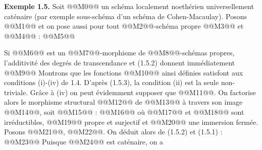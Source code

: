 
\textbf{Exemple 1.5.} Soit @@M0@@ un schéma localement noethérien universellement caténaire (par exemple sous-schéma d'un schéma de Cohen-Macaulay). Posons
@@M1@@
et on pose aussi pour tout @@M2@@-schéma propre @@M3@@ et @@M4@@ :
@@M5@@

Si @@M6@@ est un @@M7@@-morphisme de @@M8@@-schémas propres, l'additivité des degrés de transcendance et (1.5.2) donnent immédiatement
@@M9@@
Montrons que les fonctions @@M10@@ ainsi définies satisfont aux conditions (i)-(iv) de 1.4. D'après (1.5.3), la condition (ii) est la seule non-triviale. Grâce à (iv) on peut évidemment supposer que @@M11@@. On factorise alors le morphisme structural @@M12@@ de @@M13@@ à travers son image @@M14@@, soit @@M15@@ :
@@M16@@
où @@M17@@ et @@M18@@ sont irréductibles, @@M19@@ propre et surjectif et @@M20@@ une immersion fermée. Posons @@M21@@, @@M22@@. On déduit
alors de (1.5.2) et (1.5.1) :
@@M23@@
Puisque @@M24@@ est caténaire, on a
